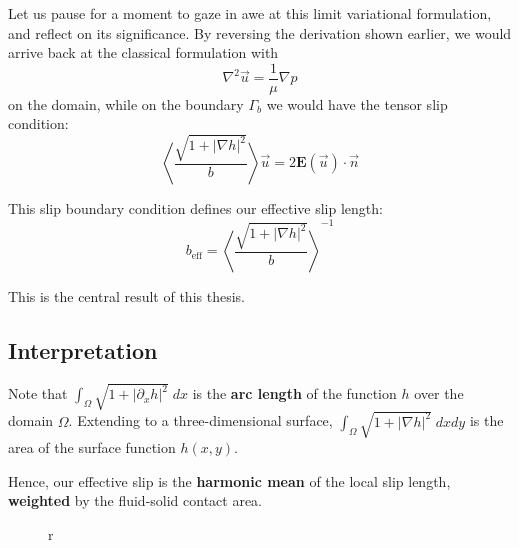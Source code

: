 \documentclass[12pt, a4paper, twoside, openright]{book}
\newcommand{\beff}{\ensuremath{b_{\mathrm{eff}}}}
\begin{document}
Let us pause for a moment to gaze in awe at this limit variational formulation, and reflect on its significance.  By reversing the derivation shown earlier,
 we would arrive back at the classical formulation with
\begin{equation}
\nabla^2 \vec{u} = \frac{1}{\mu} \nabla p
\end{equation}
on the domain, while on the boundary $\Gamma_b$ we would have the tensor slip condition:
\begin{equation}
\left< \frac{\sqrt{1 + \lvert \nabla h \rvert^2}}{b} \right> \vec{u} = 2 \mathbf{E}(\vec{u}) \cdot \vec{n}
\end{equation}

This slip boundary condition defines our effective slip length:
\begin{equation}
\beff = \left< \frac{\sqrt{1 + \lvert \nabla h \rvert^2}}{b} \right> ^{-1}
\end{equation}

This is the central result of this thesis.

\subsection*{Interpretation}
Note that $\int_{\Omega} \sqrt{1 + \lvert \partial_x h \rvert^2} \; dx$ is the \textbf{arc length} of the function $h$ over the domain $\Omega$.  Extending to a three-dimensional surface,  $\int_{\Omega} \sqrt{1 + \lvert \nabla h \rvert^2} \; dxdy$ is the area of the surface function $h(x,y)$.

Hence, our effective slip is the \textbf{harmonic mean} of the local slip length, \textbf{weighted} by the fluid-solid contact area.


\begin{figure}[ht]
\centering
{}
\caption{r}\label{r}
\end{figure}
\end{document}
